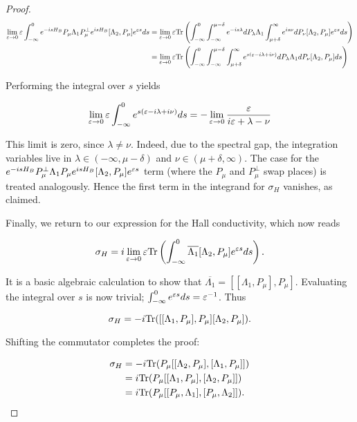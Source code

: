\documentclass[12pt, letterpaper]{article}
\begin{document}
\begin{proof}
\[\begin{aligned} 
\lim_{\varepsilon\to 0} \varepsilon \int_{-\infty}^0 e^{-isH_B}P_\mu \Lambda_1 P_\mu^\perp e^{isH_B}[\Lambda_2, P_\mu]e^{\varepsilon s} ds &= \lim_{\varepsilon\to 0} \varepsilon \text{Tr}\left( \int_{-\infty}^0 \int_{-\infty}^{\mu-\delta} e^{-is\lambda}dP_\lambda \Lambda_1 \int_{\mu+\delta}^\infty e^{is\nu} dP_\nu [\Lambda_2, P_\mu] e^{\varepsilon s} ds\right)\\
&= \lim_{\varepsilon\to 0} \varepsilon \text{Tr}\left( \int_{-\infty}^0 \int_{-\infty}^{\mu-\delta} \int_{\mu+\delta}^\infty e^{s(\varepsilon-i\lambda+i\nu)}dP_\lambda \Lambda_1 dP_\nu [\Lambda_2, P_\mu]ds\right)\\
\end{aligned}\]

Performing the integral over $s$ yields

\[\lim_{\varepsilon\to 0}\varepsilon \int_{-\infty}^0 e^{s(\varepsilon-i\lambda+i\nu)}ds = -\lim_{\varepsilon\to 0} \frac{\varepsilon}{i\varepsilon + \lambda-\nu}\]

This limit is zero, since $\lambda \neq \nu$. Indeed, due to the spectral gap, the integration variables live in $\lambda \in (-\infty, \mu-\delta)$ and $\nu \in (\mu+\delta,\infty)$. The case for the $e^{-isH_B}P_\mu^\perp \Lambda_1 P_\mu e^{isH_B}[\Lambda_2, P_\mu]e^{\varepsilon s}$ term (where the $P_\mu$ and $P_\mu^\perp$ swap places) is treated analogously. Hence the first term in the integrand for $\sigma_H$ vanishes, as claimed. 

Finally, we return to our expression for the Hall conductivity, which now reads

\[\sigma_H = i\lim_{\varepsilon\to 0}\varepsilon \text{Tr}\left(\int_{-\infty}^0 \overline{\Lambda_1}[\Lambda_2, P_\mu]e^{\varepsilon s}ds\right).\]

It is a basic algebraic calculation to show that $\overline{\Lambda_1} = [[\Lambda_1, P_\mu],P_\mu]$. Evaluating the integral over $s$ is now trivial; $\int_{-\infty}^0 e^{\varepsilon s}ds = \varepsilon^{-1}$. Thus

\[\sigma_H = -i\text{Tr}([[\Lambda_1,P_\mu],P_\mu][\Lambda_2,P_\mu]).\]

Shifting the commutator completes the proof:

\[\begin{aligned}
\sigma_H &= -i\text{Tr}(P_\mu[[\Lambda_2,P_\mu],[\Lambda_1,P_\mu]]) \\
&= i\text{Tr}(P_\mu[[\Lambda_1,P_\mu],[\Lambda_2,P_\mu]])\\
&= i\text{Tr}(P_\mu[[P_\mu,\Lambda_1],[P_\mu,\Lambda_2]]).
\end{aligned}\]

\end{proof}
\end{document}
